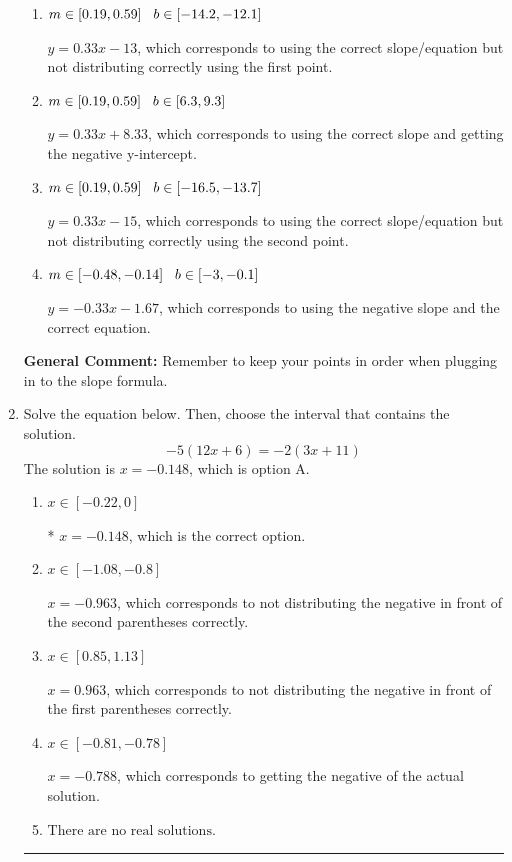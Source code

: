 \documentclass{extbook}[14pt]
\newcommand{\litem}[1]{\item #1

\rule{\textwidth}{0.4pt}}
\begin{document}
\begin{enumerate}
{\begin{enumerate}[label=\Alph*.]
* $y = 0.33x -8.33$, which is the correct option.
\item \( m \in [0.19, 0.59] \hspace*{3mm} b \in [-14.2, -12.1] \)

 $y = 0.33x -13$, which corresponds to using the correct slope/equation but not distributing correctly using the first point.
\item \( m \in [0.19, 0.59] \hspace*{3mm} b \in [6.3, 9.3] \)

 $y = 0.33x + 8.33$, which corresponds to using the correct slope and getting the negative y-intercept.
\item \( m \in [0.19, 0.59] \hspace*{3mm} b \in [-16.5, -13.7] \)

 $y = 0.33x -15$, which corresponds to using the correct slope/equation but not distributing correctly using the second point.
\item \( m \in [-0.48, -0.14] \hspace*{3mm} b \in [-3, -0.1] \)

 $y = -0.33x -1.67$, which corresponds to using the negative slope and the correct equation.
\end{enumerate}

\textbf{General Comment:} Remember to keep your points in order when plugging in to the slope formula.
}
\litem{
Solve the equation below. Then, choose the interval that contains the solution.
\[ -5(12x + 6) = -2(3x + 11) \]The solution is \( x = -0.148 \), which is option A.\begin{enumerate}[label=\Alph*.]
\item \( x \in [-0.22, 0] \)

* $x = -0.148$, which is the correct option.
\item \( x \in [-1.08, -0.8] \)

$x = -0.963$, which corresponds to not distributing the negative in front of the second parentheses correctly.
\item \( x \in [0.85, 1.13] \)

$x = 0.963$, which corresponds to not distributing the negative in front of the first parentheses correctly.
\item \( x \in [-0.81, -0.78] \)

$x = -0.788$, which corresponds to getting the negative of the actual solution.
\item \( \text{There are no real solutions.} \)


\end{enumerate}}
\end{enumerate}
\end{document}
